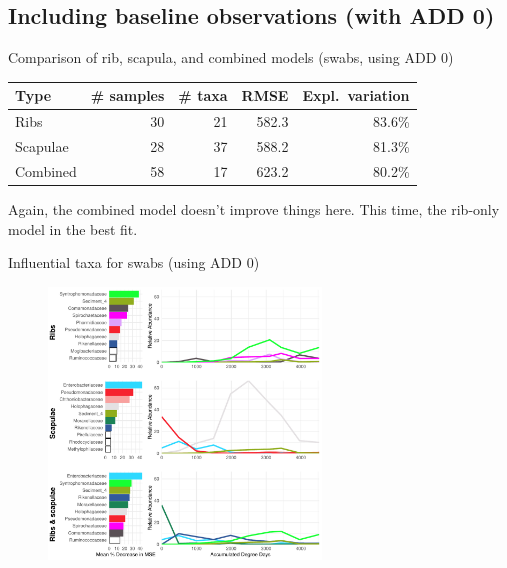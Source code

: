\documentclass{beamer}
\begin{document}
\subsection{Including baseline observations (with ADD 0)}

\begin{frame}{Comparison of rib, scapula, and combined models (swabs, using ADD 0)}

  \begin{tabular}{lrrrr}
    Type & \# samples & \# taxa & RMSE & Expl.\ variation\\ \hline
    Ribs & 30 & 21 & 582.3 & 83.6\% \\
    Scapulae & 28 & 37 & 588.2 & 81.3\% \\
    Combined & 58 & 17 & 623.2 & 80.2\%
  \end{tabular}

  \vspace{0.2in}

  \footnotesize{
    \noindent Again, the combined model doesn't improve things here.  This time,
    the rib-only model in the best fit.\\
    }
\end{frame}



\begin{frame}{Influential taxa for swabs (using ADD 0)}

  \begin{center}
    \begin{figure}
      \includegraphics[height=2.85in]
        {w_swabs/bacteria/use_families/hl_combined_family_w_baseline_6panels}
    \end{figure}
  \end{center}

\end{frame}
\end{document}

